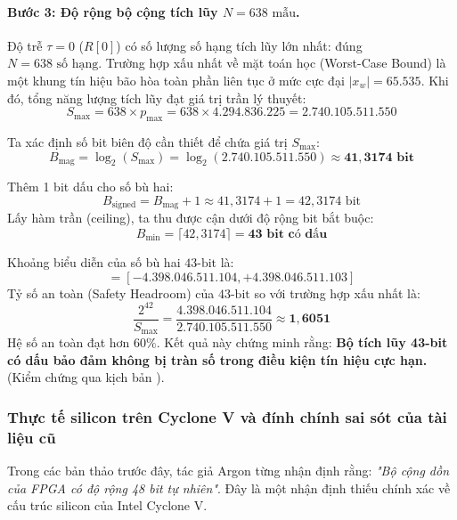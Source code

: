 \paragraph{Bước 3: Độ rộng bộ cộng tích lũy $N = 638\text{ mẫu}$.}
Độ trễ $\tau = 0$ ($R[0]$) có số lượng số hạng tích lũy lớn nhất: đúng $N = 638\text{ số hạng}$.
Trường hợp xấu nhất về mặt toán học (Worst-Case Bound) là một khung tín hiệu bão hòa toàn phần liên tục ở mức cực đại $|x_w| = 65.535$. Khi đó, tổng năng lượng tích lũy đạt giá trị trần lý thuyết:
\begin{equation}
S_{\max} = 638 \times p_{\max} = 638 \times 4.294.836.225 = \mathbf{2.740.105.511.550}
\end{equation}

Ta xác định số bit biên độ cần thiết để chứa giá trị $S_{\max}$:
\begin{equation}
B_{\text{mag}} = \log_2(S_{\max}) = \log_2(2.740.105.511.550) \approx \mathbf{41{,}3174\text{ bit}}
\end{equation}

Thêm 1 bit dấu cho số bù hai:
\begin{equation}
B_{\text{signed}} = B_{\text{mag}} + 1 \approx 41{,}3174 + 1 = 42{,}3174\text{ bit}
\end{equation}
Lấy hàm trần (ceiling), ta thu được cận dưới độ rộng bit bắt buộc:
\begin{equation}
B_{\text{min}} = \lceil 42{,}3174 \rceil = \mathbf{43\text{ bit có dấu}}
\end{equation}

Khoảng biểu diễn của số bù hai $43\text{-bit}$ là:
\begin{equation}
[-2^{42}, +2^{42}-1] = [-4.398.046.511.104, +4.398.046.511.103]
\end{equation}
Tỷ số an toàn (Safety Headroom) của $43\text{-bit}$ so với trường hợp xấu nhất là:
\begin{equation}
\frac{2^{42}}{S_{\max}} = \frac{4.398.046.511.104}{2.740.105.511.550} \approx \mathbf{1{,}6051}
\end{equation}
Hệ số an toàn đạt hơn $60\%$. Kết quả này chứng minh rằng: \textbf{Bộ tích lũy 43-bit có dấu bảo đảm không bị tràn số trong điều kiện tín hiệu cực hạn.} (Kiểm chứng qua kịch bản ).

\subsubsection*{Thực tế silicon trên Cyclone V và đính chính sai sót của tài liệu cũ}
Trong các bản thảo trước đây, tác giả Argon từng nhận định rằng: \emph{"Bộ cộng dồn của FPGA có độ rộng 48 bit tự nhiên"}. Đây là một nhận định thiếu chính xác về cấu trúc silicon của Intel Cyclone V.


